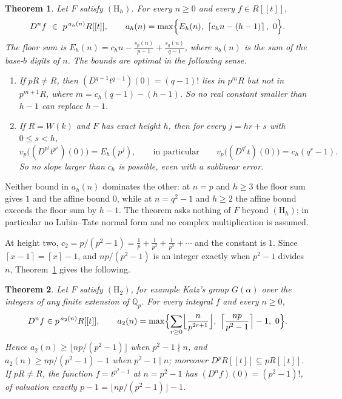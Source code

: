 \documentclass[11pt]{amsart}
\newtheorem{theorem}{Theorem}
\theoremstyle{definition}
\theoremstyle{remark}
\newcommand{\Q}{\mathbb Q}
\newcommand{\vp}{v_p}
\newcommand{\ceil}[1]{\left\lceil #1\right\rceil}
\begin{document}
\begin{theorem}\label{thmA}
Let $F$ satisfy $(\mathrm H_h)$. For every $n\ge0$ and every $f\in R[[t]]$,
\[
 D^nf\ \in\ p^{\,a_h(n)}R[[t]],\qquad
 a_h(n)=\max\Bigl\{E_h(n),\ \ceil{c_hn-(h-1)},\ 0\Bigr\}.
\]
The floor sum is $E_h(n)=c_hn-\frac{s_p(n)}{p-1}+\frac{s_q(n)}{q-1}$, where $s_b(n)$ is the sum of the base-$b$ digits of $n$. The bounds are optimal in the following sense.
\begin{enumerate}
\item If $pR\ne R$, then $(D^{q-1}t^{q-1})(0)=(q-1)!$ lies in $p^{m}R$ but not in $p^{m+1}R$, where $m=c_h(q-1)-(h-1)$. So no real constant smaller than $h-1$ can replace $h-1$.
\item If $R=W(k)$ and $F$ has exact height $h$, then for every $j=hr+s$ with $0\le s<h$,
\[
 \vp\bigl((D^{p^j}t^{p^s})(0)\bigr)=E_h(p^j),\qquad\text{in particular}\qquad \vp\bigl((D^{q^r}t)(0)\bigr)=c_h(q^r-1).
\]
So no slope larger than $c_h$ is possible, even with a sublinear error.
\end{enumerate}
\end{theorem}

Neither bound in $a_h(n)$ dominates the other: at $n=p$ and $h\ge3$ the floor sum gives $1$ and the affine bound $0$, while at $n=q^2-1$ and $h\ge2$ the affine bound exceeds the floor sum by $h-1$. The theorem asks nothing of $F$ beyond $(\mathrm H_h)$; in particular no Lubin--Tate normal form and no complex multiplication is assumed.

At height two, $c_2=p/(p^2-1)=\frac1p+\frac1{p^3}+\frac1{p^5}+\cdots$ and the constant is $1$. Since $\ceil{x-1}=\ceil x-1$, and $np/(p^2-1)$ is an integer exactly when $p^2-1$ divides $n$, Theorem~\ref{thmA} gives the following.

\begin{theorem}\label{thmB}
Let $F$ satisfy $(\mathrm H_2)$, for example Katz's group $G(\alpha)$ over the integers of any finite extension of $\Q_p$. For every integral $f$ and every $n\ge0$,
\[
 D^nf\in p^{\,a_2(n)}R[[t]],\qquad a_2(n)=\max\Bigl\{\sum_{r\ge0}\Bigl\lfloor\frac n{p^{2r+1}}\Bigr\rfloor,\ \Bigl\lceil\frac{np}{p^2-1}\Bigr\rceil-1,\ 0\Bigr\}.
\]
Hence $a_2(n)\ge\lfloor np/(p^2-1)\rfloor$ when $p^2-1\nmid n$, and $a_2(n)\ge np/(p^2-1)-1$ when $p^2-1\mid n$; moreover $D^p R[[t]]\subseteq pR[[t]]$. If $pR\ne R$, the function $f=t^{p^2-1}$ at $n=p^2-1$ has $(D^nf)(0)=(p^2-1)!$, of valuation exactly $p-1=\lfloor np/(p^2-1)\rfloor-1$.
\end{theorem}
\end{document}
